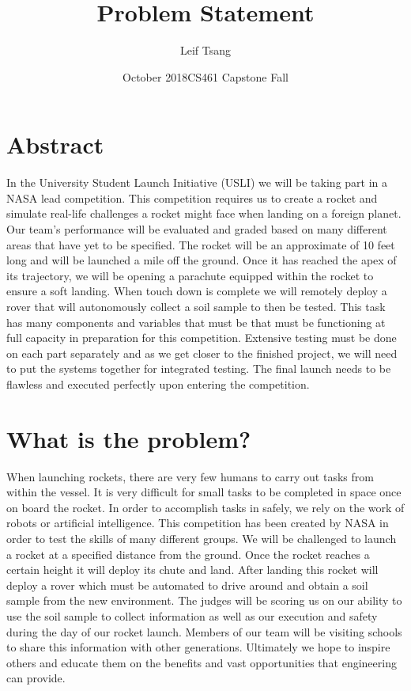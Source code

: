 \documentclass[10pt]{article}
\title{Problem Statement}
\author{Leif Tsang }
\date{October 2018}
\date{CS461 Capstone Fall}
\begin{document}

\maketitle
\vspace{3.5in}

\section{Abstract}
\sffamily
In the University Student Launch Initiative (USLI) we will be taking part in a NASA lead competition. This competition requires us to create a rocket and simulate real-life challenges a rocket might face when landing on a foreign planet. Our team’s performance will be evaluated and graded based on many different areas that have yet to be specified. The rocket will be an approximate of 10 feet long and will be launched a mile off the ground. Once it has reached the apex of its trajectory, we will be opening a parachute equipped within the rocket to ensure a soft landing. When touch down is complete we will remotely deploy a rover that will autonomously collect a soil sample to then be tested. This task has many components and variables that must be that must be functioning at full capacity in preparation for this competition. Extensive testing must be done on each part separately and as we get closer to the finished project, we will need to put the systems together for integrated testing. The final launch needs to be flawless and executed perfectly upon entering the competition. 

\vspace{1.5in}
\section{What is the problem?}
When launching rockets, there are very few humans to carry out tasks from within the vessel. It is very difficult for small tasks to be completed in space once on board the rocket. In order to accomplish tasks in safely, we rely on the work of robots or artificial intelligence. This competition has been created by NASA in order to test the skills of many different groups. We will be challenged to launch a rocket at a specified distance from the ground. Once the rocket reaches a certain height it will deploy its chute and land. After landing this rocket will deploy a rover which must be automated to drive around and obtain a soil sample from the new environment. The judges will be scoring us on our ability to use the soil sample to collect information as well as our execution and safety during the day of our rocket launch. Members of our team will be visiting schools to share this information with other generations. Ultimately we hope to inspire others and educate them on the benefits and vast opportunities that engineering can provide. 
\end{document}
